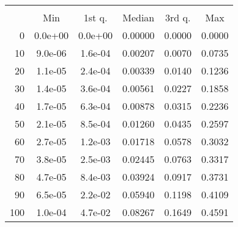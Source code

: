 \begin{tabular}{r|ccccc}
  \multicolumn{6}{c}{{\bf }} \\
  & Min & 1st q. & Median & 3rd q. & Max \\ \hline\hline
  0 & 0.0e+00 & 0.0e+00 & 0.00000 & 0.0000 & 0.0000
\\ 10 & 9.0e-06 & 1.6e-04 & 0.00207 & 0.0070 & 0.0735
\\ 20 & 1.1e-05 & 2.4e-04 & 0.00339 & 0.0140 & 0.1236
\\ 30 & 1.4e-05 & 3.6e-04 & 0.00561 & 0.0227 & 0.1858
\\ 40 & 1.7e-05 & 6.3e-04 & 0.00878 & 0.0315 & 0.2236
\\ 50 & 2.1e-05 & 8.5e-04 & 0.01260 & 0.0435 & 0.2597
\\ 60 & 2.7e-05 & 1.2e-03 & 0.01718 & 0.0578 & 0.3032
\\ 70 & 3.8e-05 & 2.5e-03 & 0.02445 & 0.0763 & 0.3317
\\ 80 & 4.7e-05 & 8.4e-03 & 0.03924 & 0.0917 & 0.3731
\\ 90 & 6.5e-05 & 2.2e-02 & 0.05940 & 0.1198 & 0.4109
\\ 100 & 1.0e-04 & 4.7e-02 & 0.08267 & 0.1649 & 0.4591
\end{tabular}
